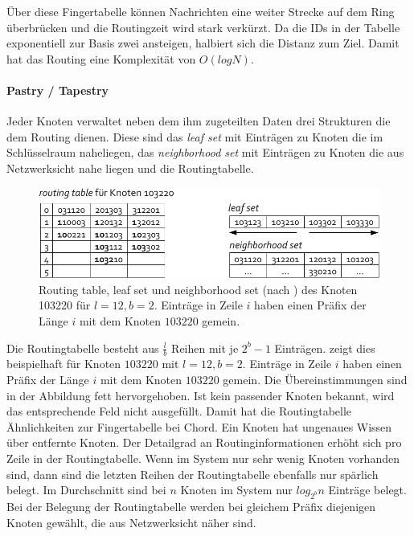 Über diese Fingertabelle können Nachrichten eine weiter Strecke auf dem Ring überbrücken und die Routingzeit wird stark verkürzt. Da die IDs in der Tabelle exponentiell zur Basis zwei ansteigen, halbiert sich die Distanz zum Ziel. Damit hat das Routing eine Komplexität von $O(log N)$.

\paragraph{Pastry / Tapestry}
Jeder Knoten verwaltet neben dem ihm zugeteilten Daten drei Strukturen die dem Routing dienen. Diese sind das \emph{leaf set} mit Einträgen zu Knoten die im Schlüsselraum naheliegen, das \emph{neighborhood set} mit Einträgen zu Knoten die aus Netzwerksicht nahe liegen und die Routingtabelle.

\begin{figure}[htb]
\centering
\includegraphics{grafics/pastry_routing_table.pdf}
\caption{Routing table, leaf set und neighborhood set (nach \cite{Goetz2005}) des Knoten 103220 für $l=12, b=2$. Einträge in Zeile $i$ haben einen Präfix der Länge $i$ mit dem Knoten $103220$ gemein.}
\label{fig:pastry_routing_table}
\end{figure}

Die Routingtabelle besteht aus $\frac{l}{b}$ Reihen mit je $2^b -1$ Einträgen.  zeigt dies beispielhaft für Knoten $103220$ mit $l=12, b=2$. Einträge in Zeile $i$ haben einen Präfix der Länge $i$ mit dem Knoten $103220$ gemein. Die Übereinstimmungen sind in der Abbildung fett hervorgehoben. Ist kein passender Knoten bekannt, wird das entsprechende Feld nicht ausgefüllt. Damit hat die Routingtabelle Ähnlichkeiten zur Fingertabelle bei Chord. Ein Knoten hat ungenaues Wissen über entfernte Knoten. Der Detailgrad an Routinginformationen erhöht sich pro Zeile in der Routingtabelle. Wenn im System nur sehr wenig Knoten vorhanden sind, dann sind die letzten Reihen der Routingtabelle ebenfalls nur spärlich belegt. Im Durchschnitt sind bei $n$ Knoten im System nur $log_{2^b} n$ Einträge belegt.\\
Bei der Belegung der Routingtabelle werden bei gleichem Präfix diejenigen Knoten gewählt, die aus Netzwerksicht näher sind.

